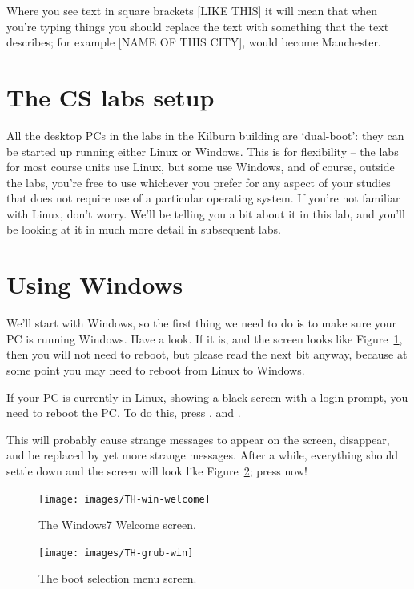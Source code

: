 Where you see text in square brackets [LIKE THIS] it will mean that
when you're typing things you should replace the text with something
that the text describes; for example [NAME OF THIS CITY], would become
Manchester.

\section{The CS labs setup}

All the desktop PCs in the labs in the Kilburn building are
`dual-boot': they can be started up running either Linux or
Windows. This is for flexibility -- the labs for most course units use
Linux, but some use Windows, and of course, outside the labs, you're
free to use whichever you prefer for any aspect of your studies that
does not require use of a particular operating system. If you're not
familiar with Linux, don't worry. We'll be telling you a bit about it
in this lab, and you'll be looking at it in much more detail in
subsequent labs.

\section{Using Windows}
\label{sec:using-windows}

We'll start with Windows, so the first thing we need to do is to make
sure your PC is running Windows. Have a look. If it is, and the screen
looks like Figure~\ref{figure:welc-screen}, then you will not need to
reboot, but please read the next bit anyway, because at some point you
may need to reboot from Linux to Windows.

If your PC is currently in Linux, showing a black screen with a login prompt,  you need to reboot the PC. To do
this, press ,  and .

This will probably cause strange messages to appear on the screen,
disappear, and be replaced by yet more strange messages.  After a while,
everything should settle down and the screen will look like
Figure~\ref{figure:welc-grub}; press  now!

\begin{figure}
\centerline{\texttt{[image: images/TH-win-welcome]}}
\caption{The Windows7 Welcome screen.}
\label{figure:welc-screen}
\end{figure}

\begin{figure}
\centerline{\texttt{[image: images/TH-grub-win]}}
\caption{The boot selection menu screen.}
\label{figure:welc-grub}
\end{figure}

